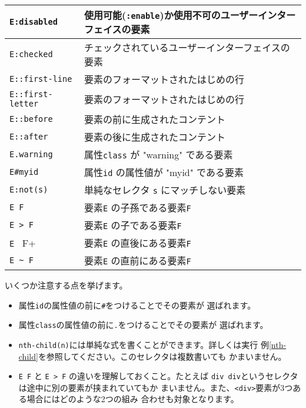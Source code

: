\begin{longtable}{|m{13em}|m{}|}
\verb+E:disabled+&使用可能(\texttt{:enable})か使用不可のユーザーインター
     フェイスの要素%
\\\hline
\verb+E:checked+&チェックされているユーザーインターフェイスの要素%
\\\hline
\verb+E::first-line+&要素のフォーマットされたはじめの行%
\\\hline
\verb+E::first-letter+&要素のフォーマットされたはじめの行%
\\\hline
\verb+E::before+&要素の前に生成されたコンテント%
\\\hline
\verb+E::after+&要素の後に生成されたコンテント%
\\\hline
\verb+E.warning+&属性\texttt{class} が "warning" である要素%
\\\hline
\verb+E#myid+&属性\texttt{id} の属性値が "myid" である要素%
\\\hline
\verb+E:not(s)+&単純なセレクタ \texttt{s} にマッチしない要素%
\\\hline
\verb+E F+&要素\texttt{E} の子孫である要素\texttt{F}%
\\\hline
\verb+E > F+&要素\texttt{E} の子である要素\texttt{F}%
\\\hline
\verb+E + F+&要素\texttt{E} の直後にある要素\texttt{F}%
\\\hline
\verb+E ~ F+&要素\texttt{E} の直前にある要素\texttt{F}%
\\\hline
\end{longtable}

いくつか注意する点を挙げます。
\begin{itemize}
 \item 属性\texttt{id}の属性値の前に\texttt{\#}をつけることでその要素が
       選ばれます。
 \item 属性\texttt{class}の属性値の前に\texttt{.}をつけることでその要素が
       選ばれます。
 \item \texttt{nth-child(n)}には単純な式を書くことができます。詳しくは実行
       例\ref{nth-child}を参照してください。このセレクタは複数書いても
       かまいません。
 \item \verb+E F+ と \verb+E > F+ の違いを理解しておくこと。たとえば
       \texttt{div div}というセレクタは途中に別の要素が挟まれていてもか
       まいません。また、\texttt{<div>}要素が3つある場合にはどのような2つの組み
       合わせも対象となります。
\end{itemize}

